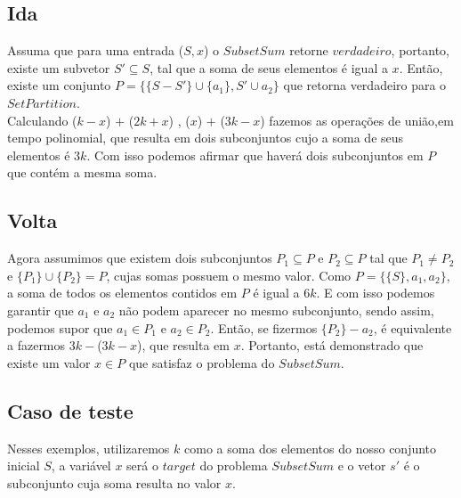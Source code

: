 \documentclass[12pt]{article}
\begin{document}
\subsection{Ida}

Assuma que para uma entrada ($S,x$) o $SubsetSum$ retorne $verdadeiro$, portanto, existe um subvetor $S'\subseteq S$, tal que a soma de seus elementos é igual a $x$. Então, existe um conjunto $P = \{\{S - S'\} \cup \{a_1\} , S' \cup a_2\}$ que retorna verdadeiro para o $SetPartition$.\\
Calculando ($k - x$) $+$ ($2k + x$) , ($x$) $+$ ($3k - x$) fazemos as operações de união,em tempo polinomial, que resulta em dois subconjuntos cujo a soma de seus elementos é $3k$. Com isso podemos afirmar que haverá dois subconjuntos em $P$ que contém a mesma soma.

\subsection{Volta}

Agora assumimos que existem dois subconjuntos $P_1 \subseteq P$ e $P_2 \subseteq P$ tal que $P_1 \neq P_2$ e $\{P_1\} \cup \{P_2\} = P$, cujas somas possuem o mesmo valor. Como $P = \{\{S\},a_1,a_2\}$, a soma de todos os elementos contidos em $P$ é igual a $6k$. E com isso podemos garantir que $a_1$ e $a_2$ não podem aparecer no mesmo subconjunto, sendo assim, podemos supor que $a_1 \in P_1$ e $a_2 \in P_2$. Então, se fizermos $\{P_2\} - a_2$, é equivalente a fazermos $3k - $($3k - x$), que resulta em $x$. Portanto, está demonstrado que existe um valor $x \in P$ que satisfaz o problema do $SubsetSum$.

\subsection{Caso de teste}
Nesses exemplos, utilizaremos $k$ como a soma dos elementos do nosso conjunto inicial $S$, a variável $x$ será o $target$ do problema $SubsetSum$ e o vetor $s'$ é o subconjunto cuja soma resulta no valor $x$.
\end{document}
